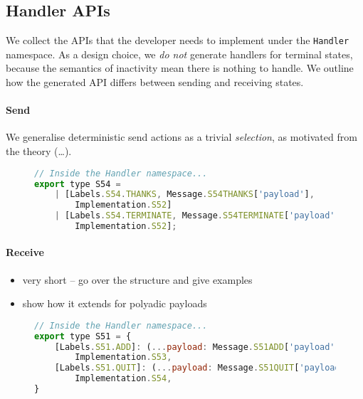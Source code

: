\subsection{Handler APIs}

We collect the APIs that the developer needs to implement
under the \texttt{Handler} namespace. 
As a design choice, we \textit{do not} generate handlers for
terminal states, because the semantics of inactivity mean
there is nothing to handle.
We outline how the generated API differs between sending
and receiving states.

\paragraph{Send}
We generalise deterministic send actions as a trivial \textit{selection}, 
as motivated from the theory (\dots).

\begin{figure}[!ht]
\begin{lstlisting}[language=javascript, tabsize=2]
// Inside the Handler namespace...
export type S54 = 
	| [Labels.S54.THANKS, Message.S54THANKS['payload'],
		Implementation.S52] 
	| [Labels.S54.TERMINATE, Message.S54TERMINATE['payload'], 
		Implementation.S52];
\end{lstlisting}
\end{figure}

\paragraph{Receive}
\begin{itemize}
\item very short -- go over the structure and give examples
\item show how it extends for polyadic payloads
\end{itemize}

\begin{figure}[!ht]
\begin{lstlisting}[language=javascript,tabsize=2]
// Inside the Handler namespace...
export type S51 = {
	[Labels.S51.ADD]: (...payload: Message.S51ADD['payload']) =>
		Implementation.S53,
	[Labels.S51.QUIT]: (...payload: Message.S51QUIT['payload']) => 
		Implementation.S54,
}
\end{lstlisting}
\end{figure}

